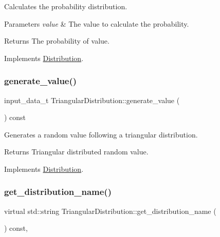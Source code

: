 Calculates the probability distribution. 
\begin{DoxyParams}{Parameters}
{\em value} & The value to calculate the probability. \\
\hline
\end{DoxyParams}
\begin{DoxyReturn}{Returns}
The probability of value. 
\end{DoxyReturn}


Implements \hyperlink{classDistribution_a5146d1193531b15a872d401cb97f06ca}{Distribution}.

\mbox{\label{classTriangularDistribution_a2fd4ac4297a82fc223cdb0d3a81408cb}} 
\subsubsection{\texorpdfstring{generate\+\_\+value()}{generate\_value()}}
{\footnotesize\ttfamily input\+\_\+data\+\_\+t Triangular\+Distribution\+::generate\+\_\+value (\begin{DoxyParamCaption}{ }\end{DoxyParamCaption}) const\hspace{0.3cm}{\ttfamily [virtual]}}

Generates a random value following a triangular distribution. \begin{DoxyReturn}{Returns}
Triangular distributed random value. 
\end{DoxyReturn}


Implements \hyperlink{classDistribution_a096af8a5e59bd38e0ad7da10632e0c83}{Distribution}.

\mbox{\label{classTriangularDistribution_ae9ceb04d07ea5f9dd9390ec62a7d0849}} 
\subsubsection{\texorpdfstring{get\+\_\+distribution\+\_\+name()}{get\_distribution\_name()}}
{\footnotesize\ttfamily virtual std\+::string Triangular\+Distribution\+::get\+\_\+distribution\+\_\+name (\begin{DoxyParamCaption}{ }\end{DoxyParamCaption}) const\hspace{0.3cm}{\ttfamily [inline]}, {\ttfamily [virtual]}}

